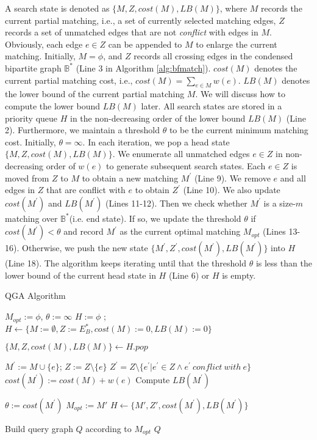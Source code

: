A search state is denoted as $\{M,Z, cost(M), LB(M)\}$, where $M$ records the current partial matching, i.e., a set of currently selected matching edges, $Z$ records a set of unmatched edges that are not \emph{conflict} with edges in $M$. Obviously, each edge $e \in Z$ can be appended to $M$ to enlarge the current matching. Initially, $M=\phi$, and $Z$ records all crossing edges in the condensed bipartite graph $\mathbb{B}^{*}$ (Line 3 in Algorithm \ref{alg:bfmatch}). $cost(M)$ denotes the current partial matching cost, i.e., $cost(M)= \sum\nolimits_{e \in M} {w(e)}$. $LB(M)$ denotes the lower bound of the current partial matching $M$. We will discuss how to compute the lower bound $LB(M)$ later. All search states are stored in a priority queue $H$ in the non-decreasing order of the lower bound $LB(M)$ (Line 2). Furthermore, we maintain a threshold $\theta$ to be the current minimum matching cost. Initially, $\theta = \infty$. In each iteration, we pop a head state $\{M,Z, cost(M), LB(M)\}$.
We enumerate all unmatched edges $e \in Z$ in non-decreasing order of $w(e)$ to generate subsequent search states. Each $e \in Z$ is moved from $Z$ to $M$ to obtain a new matching $M^{\prime}$ (Line 9). We remove $e$ and all edges in $Z$ that are conflict with $e$ to obtain $Z^{\prime}$ (Line 10). We also update $cost(M^{\prime})$ and $LB(M^{\prime})$ (Lines 11-12). Then we check whether $M^{\prime}$ is a size-$m$ matching over $\mathbb{B}^{*}$(i.e. end state). If so, we update the threshold $\theta$ if $cost(M^{\prime}) < \theta$ and record $M^{\prime}$ as the current optimal matching $M_{opt}$  (Lines 13-16). Otherwise, we push the new state $\{M^{\prime},Z^{\prime}, cost(M^{\prime}), LB(M^{\prime})\}$ into $H$ (Line 18). The algorithm keeps iterating until that the threshold $\theta$ is less than the lower bound of the current head state in $H$ (Line 6) or $H$ is empty. 
\begin{algorithm} 
	\caption{QGA Algorithm} \label{alg:bfmatch}
	$M_{opt} := \phi$, $\theta := \infty$ \;
	$H := \phi$ ;
	$H \leftarrow \{M:=\emptyset, Z := E_B^*, cost(M) := 0, LB(M) := 0\}$ \;
	{
		$\{M, Z, cost(M), LB(M)\} \leftarrow H.pop$ \;
		
		{
			$M^{\prime} := M \cup \{e\}$; $Z := Z \setminus \{e\}$ \;
			$Z^{\prime} = Z \setminus \{e^\prime | e^\prime \in Z \wedge e^\prime\ conflict\ with\ e\}$ \;
			$cost(M^{\prime}) := cost(M) + w(e)$ \;
			Compute $LB(M^{\prime})$\;
			
			{
				{
					$\theta := cost(M^{\prime})$ \;
					$M_{opt} := M'$ \;
				}       
			}
			\Else
			{
				$H \leftarrow \{M', Z', cost(M^{\prime}), LB(M^{\prime})\}$ \;
			}       
		}
	}
	Build query graph $Q$ according to $M_{opt}$ \;
	\Return $Q$
\end{algorithm}

